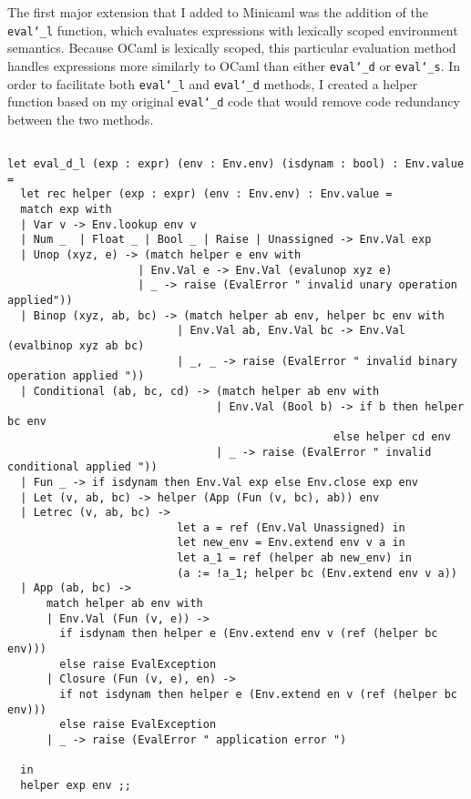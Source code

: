 \documentclass{article}
\begin{document}
The first major extension that I added to Minicaml was the addition of the \texttt{eval\char`_l} function, which evaluates expressions with lexically scoped environment semantics. Because OCaml is lexically scoped, this particular evaluation method handles expressions more similarly to OCaml than either \texttt{eval\char`_d} or \texttt{eval\char`_s}. In order to facilitate both \texttt{eval\char`_l} and \texttt{eval\char`_d} methods, I created a helper function based on my original \texttt{eval\char`_d} code that would remove code redundancy between the two methods. 
\begin{verbatim}

let eval_d_l (exp : expr) (env : Env.env) (isdynam : bool) : Env.value = 
  let rec helper (exp : expr) (env : Env.env) : Env.value =
  match exp with 
  | Var v -> Env.lookup env v 
  | Num _  | Float _ | Bool _ | Raise | Unassigned -> Env.Val exp
  | Unop (xyz, e) -> (match helper e env with 
                    | Env.Val e -> Env.Val (evalunop xyz e)
                    | _ -> raise (EvalError " invalid unary operation applied"))
  | Binop (xyz, ab, bc) -> (match helper ab env, helper bc env with 
                          | Env.Val ab, Env.Val bc -> Env.Val (evalbinop xyz ab bc) 
                          | _, _ -> raise (EvalError " invalid binary operation applied "))
  | Conditional (ab, bc, cd) -> (match helper ab env with 
                                | Env.Val (Bool b) -> if b then helper bc env 
                                                  else helper cd env 
                                | _ -> raise (EvalError " invalid conditional applied "))
  | Fun _ -> if isdynam then Env.Val exp else Env.close exp env
  | Let (v, ab, bc) -> helper (App (Fun (v, bc), ab)) env
  | Letrec (v, ab, bc) -> 
                          let a = ref (Env.Val Unassigned) in
                          let new_env = Env.extend env v a in
                          let a_1 = ref (helper ab new_env) in
                          (a := !a_1; helper bc (Env.extend env v a))
  | App (ab, bc) -> 
      match helper ab env with 
      | Env.Val (Fun (v, e)) -> 
        if isdynam then helper e (Env.extend env v (ref (helper bc env)))
        else raise EvalException
      | Closure (Fun (v, e), en) -> 
        if not isdynam then helper e (Env.extend en v (ref (helper bc env)))
        else raise EvalException
      | _ -> raise (EvalError " application error ")

  in 
  helper exp env ;;
\end{verbatim}
\end{document}
